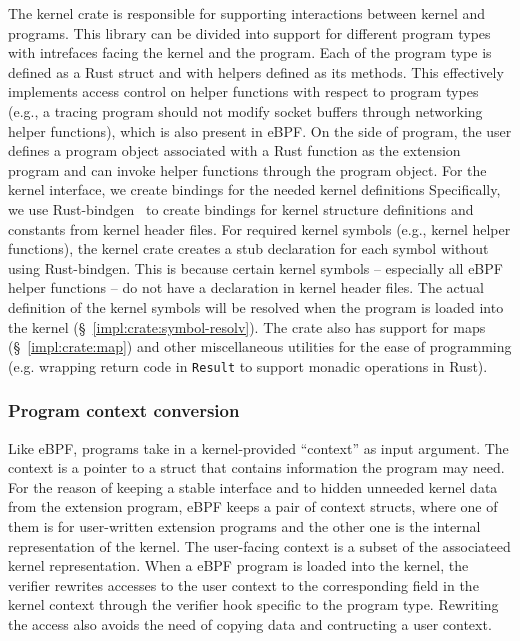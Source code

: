 The \projname{} kernel crate is responsible for supporting interactions between
    kernel and \projname{} programs.
This library can be divided into support for different program types with
    intrefaces facing the kernel and the \projname{} program.
Each of the program type is defined as a Rust struct and with helpers defined
    as its methods.
This effectively implements access control on helper functions with respect to
    program types (e.g., a tracing program should not modify socket buffers
    through networking helper functions), which is also present in eBPF.
On the side of \projname{} program, the user defines a program object
    associated with a Rust function as the extension program and can invoke
    helper functions through the program object.
For the kernel interface, we create bindings for the needed kernel definitions
Specifically, we use Rust-bindgen~\cite{bindgen} to create bindings for kernel
    structure definitions and constants from kernel header files.
For required kernel symbols (e.g., kernel helper functions), the kernel crate
    creates a stub declaration for each symbol without using Rust-bindgen.
This is because certain kernel symbols -- especially all eBPF helper
    functions --  do not have a declaration in kernel header files.
The actual definition of the kernel symbols will be resolved when the program
    is loaded into the kernel (\S~\ref{impl:crate:symbol-resolv}).
The crate also has support for maps (\S~\ref{impl:crate:map}) and other
    miscellaneous utilities for the ease of programming (e.g. wrapping return
    code in \texttt{Result} to support monadic operations in Rust).

\subsubsection{Program context conversion}
Like eBPF, \projname{} programs take in a kernel-provided ``context'' as input
    argument.
The context is a pointer to a struct that contains information the program may
    need.
For the reason of keeping a stable interface and to hidden unneeded kernel
    data from the extension program, eBPF keeps a pair of context structs,
    where one of them is for user-written extension programs and the other one
    is the internal representation of the kernel.
The user-facing context is a subset of the associateed kernel
    representation.
When a eBPF program is loaded into the kernel, the verifier rewrites accesses
    to the user context to the corresponding field in the kernel context
    through the verifier hook specific to the program type.
Rewriting the access also avoids the need of copying data and contructing a
    user context.

